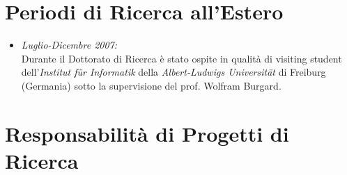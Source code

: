 \documentclass[11pt]{article}
\newcommand{\ITEMDATE}[1]{\item \textit{#1:}\\}
\begin{document}

\section*{Periodi di Ricerca all'Estero}

\begin{itemize}

\ITEMDATE{Luglio-Dicembre 2007} 
Durante il Dottorato di Ricerca \`e stato ospite in qualit\`a di visiting student 
dell'\textit{Institut f\"ur Informatik} della \textit{Albert-Ludwigs Universit\"at} 
di Freiburg (Germania) sotto la supervisione del prof. Wolfram Burgard.

\end{itemize}


\section*{Responsabilit\`a di Progetti di Ricerca}
\end{document}
